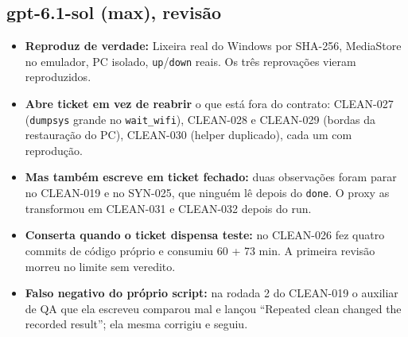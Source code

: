 \documentclass[11pt,a4paper]{article}
\begin{document}
\subsection*{gpt-6.1-sol (max), revisão}
\begin{itemize}
  \item \textbf{Reproduz de verdade:} Lixeira real do Windows por SHA-256,
        MediaStore no emulador, PC isolado, \texttt{up}/\texttt{down} reais. Os
        três reprovações vieram reproduzidos.
  \item \textbf{Abre ticket em vez de reabrir} o que está fora do contrato:
        CLEAN-027 (\texttt{dumpsys} grande no \texttt{wait\_wifi}), CLEAN-028 e
        CLEAN-029 (bordas da restauração do PC), CLEAN-030 (helper duplicado),
        cada um com reprodução.
  \item \textbf{Mas também escreve em ticket fechado:} duas observações foram
        parar no CLEAN-019 e no SYN-025, que ninguém lê depois do
        \texttt{done}. O proxy as transformou em CLEAN-031 e CLEAN-032 depois do
        run.
  \item \textbf{Conserta quando o ticket dispensa teste:} no CLEAN-026 fez
        quatro commits de código próprio e consumiu 60 + 73 min. A primeira
        revisão morreu no limite sem veredito.
  \item \textbf{Falso negativo do próprio script:} na rodada 2 do CLEAN-019 o
        auxiliar de QA que ela escreveu comparou mal e lançou ``Repeated clean
        changed the recorded result''; ela mesma corrigiu e seguiu.
\end{itemize}
\end{document}

